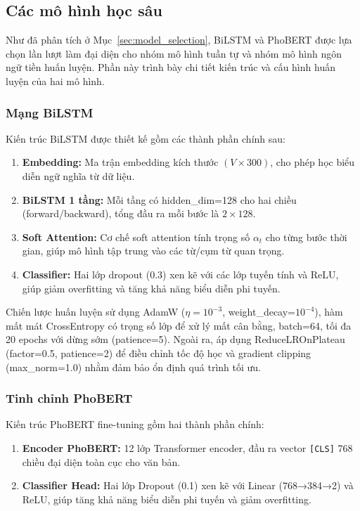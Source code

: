 \documentclass[12pt, a4paper]{report}
\newcommand{\bilstmEmbDim}{300}
\newcommand{\bilstmHiddenDim}{128}
\newcommand{\bilstmLayers}{1}
\begin{document}
\subsection{Các mô hình học sâu}

Như đã phân tích ở Mục~\ref{sec:model_selection}, BiLSTM và PhoBERT được lựa chọn lần lượt
làm đại diện cho nhóm mô hình tuần tự và nhóm mô hình ngôn ngữ tiền
huấn luyện. Phần này trình bày chi tiết kiến trúc và cấu hình huấn
luyện của hai mô hình.

\subsubsection{Mạng BiLSTM}

Kiến trúc BiLSTM được thiết kế gồm các thành phần chính sau:

\begin{enumerate}[leftmargin=2.5em]
  \item \textbf{Embedding:} Ma trận embedding kích thước $(V \times \bilstmEmbDim)$, cho phép học biểu diễn ngữ nghĩa từ dữ liệu.
  \item \textbf{BiLSTM \bilstmLayers{} tầng:} Mỗi tầng có hidden\_dim=\bilstmHiddenDim{} cho hai chiều (forward/backward), tổng đầu ra mỗi bước là $2\times\bilstmHiddenDim$.
  \item \textbf{Soft Attention:} Cơ chế soft attention tính trọng số $\alpha_t$ cho từng bước thời gian, giúp mô hình tập trung vào các từ/cụm từ quan trọng.
  \item \textbf{Classifier:} Hai lớp dropout (0.3) xen kẽ với các lớp tuyến tính và ReLU, giúp giảm overfitting và tăng khả năng biểu diễn phi tuyến.
\end{enumerate}

Chiến lược huấn luyện sử dụng AdamW
($\eta = 10^{-3}$, weight\_decay=$10^{-4}$), hàm mất mát CrossEntropy
có trọng số lớp để xử lý mất cân bằng, batch=64, tối đa 20 epochs với
dừng sớm (patience=5). Ngoài ra, áp dụng ReduceLROnPlateau
(factor=0.5, patience=2) để điều chỉnh tốc độ học và gradient clipping
(max\_norm=1.0) nhằm đảm bảo ổn định quá trình tối ưu.

\subsubsection{Tinh chỉnh PhoBERT}

Kiến trúc PhoBERT fine-tuning gồm hai thành phần chính:

\begin{enumerate}[leftmargin=2.5em]
  \item \textbf{Encoder PhoBERT:} 12 lớp Transformer encoder, đầu ra vector \texttt{[CLS]} 768 chiều đại diện toàn cục cho văn bản.
  \item \textbf{Classifier Head:} Hai lớp Dropout (0.1) xen kẽ với Linear (768→384→2) và ReLU, giúp tăng khả năng biểu diễn phi tuyến và giảm overfitting.
\end{enumerate}
\end{document}
